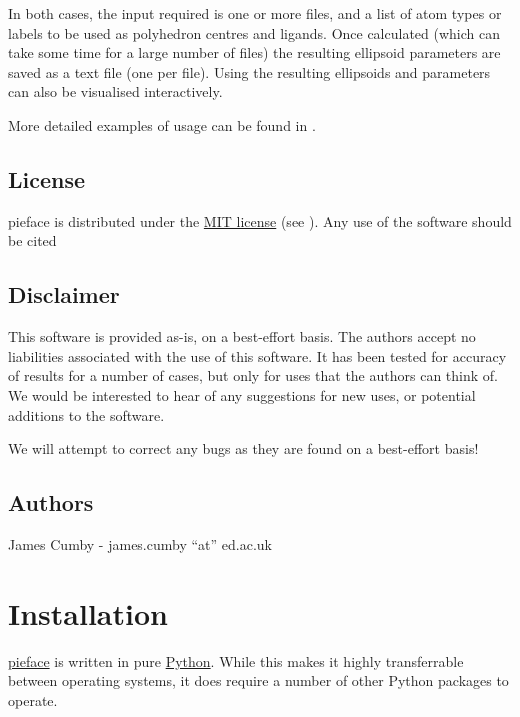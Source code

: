 \documentclass[a4paper,10pt,openany, oneside]{sphinxmanual}
\begin{document}
In both cases, the input required is one or more {\hyperref[glossary:term\string-cif]{}} files, and a list of atom types or labels to be used as polyhedron centres and ligands.
Once calculated (which can take some time for a large number of files) the resulting ellipsoid parameters are saved as a text file (one per {\hyperref[glossary:term\string-cif]{}} file).
Using  the resulting ellipsoids and parameters can also be visualised interactively.

More detailed examples of usage can be found in {\hyperref[tutorial:tutorials]{}}.


\section{License}
\label{introduction:license}
pieface is distributed under the \href{https://opensource.org/licenses/MIT}{MIT license} (see ). Any use of the software should be cited


\section{Disclaimer}
\label{introduction:disclaimer}
This software is provided as-is, on a best-effort basis. The authors accept no liabilities associated with the use of this software.
It has been tested for accuracy of results for a number of cases, but only for uses that the authors can think of. We would be interested
to hear of any suggestions for new uses, or potential additions to the software.

We will attempt to correct any bugs as they are found on a best-effort basis!


\section{Authors}
\label{introduction:authors}
James Cumby - james.cumby ``at'' ed.ac.uk


\chapter{Installation}
\label{installation:installation}\label{installation:citation}\label{installation::doc}\label{installation:id1}
\href{http://www.csec.ed.ac.uk}{pieface} is written in pure \href{https://www.python.org/\textgreater{}}{Python}. While this makes it highly transferrable between operating systems,
it does require a number of other Python packages to operate.
\end{document}
